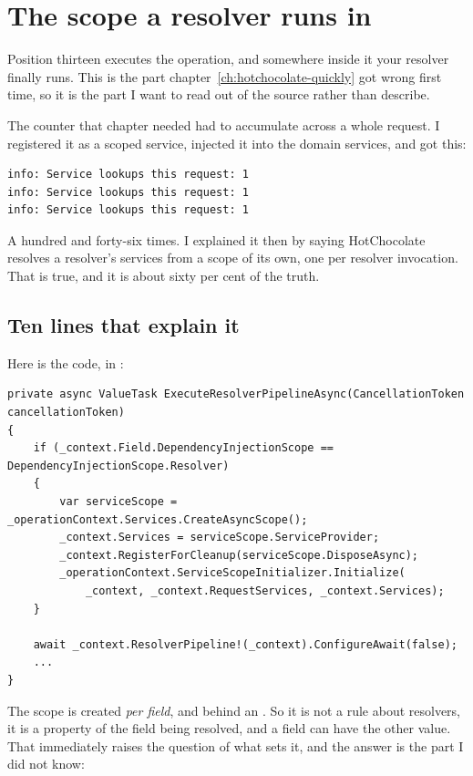 \section{The scope a resolver runs in}
\label{sec:ch03-scopes}

Position thirteen executes the operation, and somewhere inside it your resolver
finally runs. This is the part chapter~\ref{ch:hotchocolate-quickly} got wrong
first time, so it is the part I want to read out of the source rather than
describe.

The counter that chapter needed had to accumulate across a whole request. I
registered it as a scoped service, injected it into the domain services, and got
this:

\begin{verbatim}
info: Service lookups this request: 1
info: Service lookups this request: 1
info: Service lookups this request: 1
\end{verbatim}

A hundred and forty-six times. I explained it then by saying HotChocolate
resolves a resolver's services from a scope of its own, one per resolver
invocation. That is true, and it is about sixty per cent of the truth.

\subsection*{Ten lines that explain it}

%
Here is the code, in :

\begin{verbatim}
private async ValueTask ExecuteResolverPipelineAsync(CancellationToken cancellationToken)
{
    if (_context.Field.DependencyInjectionScope == DependencyInjectionScope.Resolver)
    {
        var serviceScope = _operationContext.Services.CreateAsyncScope();
        _context.Services = serviceScope.ServiceProvider;
        _context.RegisterForCleanup(serviceScope.DisposeAsync);
        _operationContext.ServiceScopeInitializer.Initialize(
            _context, _context.RequestServices, _context.Services);
    }

    await _context.ResolverPipeline!(_context).ConfigureAwait(false);
    ...
}
\end{verbatim}

The scope is created \emph{per field}, and behind an . So it is not a
rule about resolvers, it is a property of the field being resolved, and a field
can have the other value. That immediately raises the question of what sets it,
and the answer is the part I did not know:

